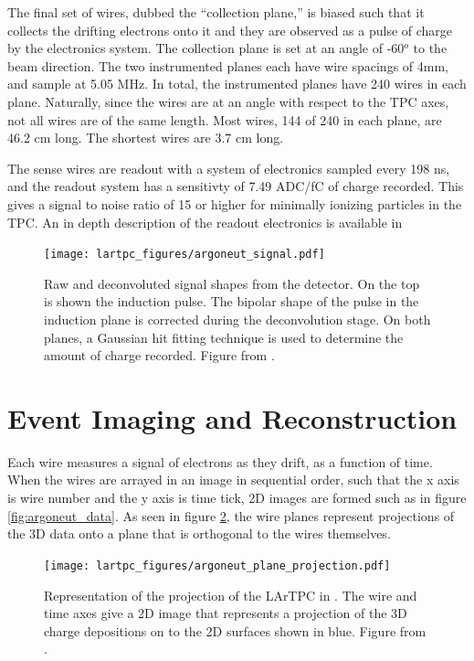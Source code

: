 The final set of wires, dubbed the ``collection plane,'' is biased such that it collects the drifting electrons onto it and they are observed as a pulse of charge by the electronics system.  The collection plane is set at an angle of -60$^o$ to the beam direction.  The two instrumented planes each have wire spacings of 4mm, and sample at 5.05 MHz.  In total, the instrumented planes have 240 wires in each plane.  Naturally, since the wires are at an angle with respect to the TPC axes, not all wires are of the same length.  Most wires, 144 of 240 in each plane, are 46.2 cm long.  The shortest wires are 3.7 cm long.

The sense wires are readout with a system of electronics sampled every 198 ns, and the readout system has a sensitivty of 7.49 ADC/fC of charge recorded.  This gives a signal to noise ratio of 15 or higher for minimally ionizing particles in the TPC.  An in depth description of the \argoneut readout electronics is available in \cite{Anderson:2012vc.}


\begin{figure}[h]
  \centering
  \texttt{[image: lartpc\_figures/argoneut\_signal.pdf]}
  \caption{Raw and deconvoluted signal shapes from the \argoneut detector.  On the top is shown the induction pulse.  The bipolar shape of the pulse in the induction plane is corrected during the deconvolution stage.  On both planes, a Gaussian hit fitting technique is used to determine the amount of charge recorded. Figure from \cite{Anderson:2012vc}.}
  \label{fig:argoneut_signals}
\end{figure}

\section{\label{sec:lartpc_reconstruction} Event Imaging and Reconstruction}

Each wire measures a signal of electrons as they drift, as a function of time.  When the wires are arrayed in an image in sequential order, such that the x axis is wire number and the y axis is time tick, 2D images are formed such as in figure \ref{fig:argoneut_data}.  As seen in figure \ref{fig:argoneut_projection}, the wire planes represent projections of the 3D data onto a plane that is orthogonal to the wires themselves.


\begin{figure}[h]
  \centering
  \texttt{[image: lartpc\_figures/argoneut\_plane\_projection.pdf]}
  \caption{Representation of the projection of the LArTPC in \argoneut.  The wire and time axes give a 2D image that represents a projection of the 3D charge depositions on to the 2D surfaces shown in blue.  Figure from \cite{Anderson:2012vc}.}
  \label{fig:argoneut_projection}
\end{figure}

